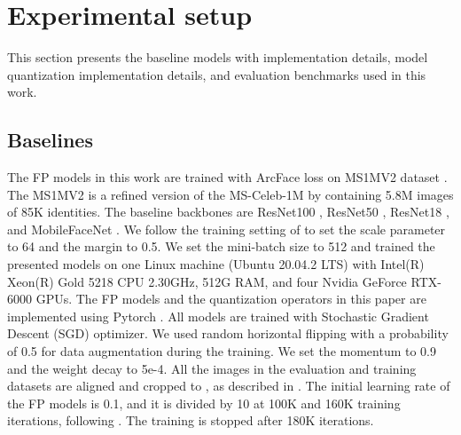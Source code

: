 \documentclass[a4paper,conference]{IEEEtran}
\begin{document}
\vspace{-1mm}
\section{Experimental setup}
\label{sec:exp}
\vspace{-1mm}
This section presents the baseline models with implementation details, model quantization implementation details, and evaluation benchmarks used in this work. 


\vspace{-1mm}
\subsection{Baselines}
\label{sec:exp_baseline}
\vspace{-1mm}
The FP models in this work are trained with ArcFace loss \cite{deng2019arcface} on MS1MV2 dataset \cite{guo2016ms,deng2019arcface}. 
The MS1MV2 is a refined version of the MS-Celeb-1M \cite{guo2016ms} by \cite{deng2019arcface} containing 5.8M images of 85K identities. 
The baseline backbones are ResNet100 \cite{resnet,deng2019arcface}, ResNet50 \cite{resnet,deng2019arcface}, ResNet18 \cite{resnet,deng2019arcface}, and MobileFaceNet \cite{mobilefacenet}. 
We follow the training setting of \cite{deng2019arcface} to set the scale parameter  to 64 and the margin  to 0.5. 
We set the mini-batch size to 512 and trained the presented models on one Linux machine (Ubuntu 20.04.2 LTS) with Intel(R) Xeon(R) Gold 5218 CPU 2.30GHz, 512G RAM, and four Nvidia GeForce RTX-6000 GPUs. 
The FP models and the quantization operators in this paper are implemented using Pytorch \cite{NEURIPS2019_9015}.
All models are trained with Stochastic Gradient Descent (SGD) optimizer.
We used random horizontal flipping with a probability of 0.5 for data augmentation during the training.
We set the momentum to 0.9 and the weight decay to 5e-4. 
All the images in the evaluation and training datasets are aligned and cropped to , as described in \cite{deng2019arcface}.
The initial learning rate of the FP models is 0.1, and it is divided by 10 at 100K and 160K training iterations, following \cite{deng2019arcface}. The training is stopped after 180K iterations.
\end{document}
